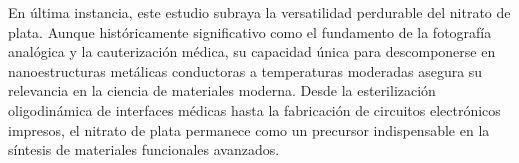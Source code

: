 \documentclass[pdflatex,sn-mathphys-num,draft]{sn-jnl}
\theoremstyle{thmstyleone}%
\theoremstyle{thmstyletwo}%
\theoremstyle{thmstylethree}%
\begin{document}
En última instancia, este estudio subraya la versatilidad perdurable del nitrato
de plata. Aunque históricamente significativo como el fundamento de la
fotografía analógica y la cauterización médica, su capacidad única para
descomponerse en nanoestructuras metálicas conductoras a temperaturas moderadas
asegura su relevancia en la ciencia de materiales moderna. Desde la
esterilización oligodinámica de interfaces médicas hasta la fabricación de
circuitos electrónicos impresos, el nitrato de plata permanece como un precursor
indispensable en la síntesis de materiales funcionales avanzados.


\end{document}
